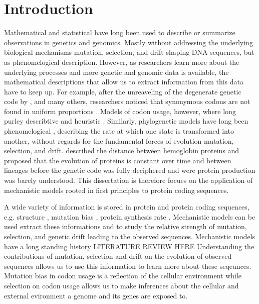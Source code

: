 \chapter{Introduction} 
\label{ch:introduction}

Mathematical and statistical have long been used to describe or summarize observations in genetics and genomics.
Mostly without addressing the underlying biological mechanisms mutation, selection, and drift shaping DNA sequences, but as phenomelogical description.
However, as researchers learn more about the underlying processes and more genetic and genomic data is available, the mathematical descriptions that allow us to extract information from this data have to keep up.
For example, after the unreaveling of the degenerate genetic code by \citet{MatthaeiAndNirenberg1961,NirenbergAndMatthaei1961,Maxwell1962,LederAndNirenberg1964}, and many others, researchers noticed that synonymous codons are not found in uniform proportions \citep{fitch1976,grantham1980,ikemura1981,grantham1981,sharp1988}.
Models of codon usage, however, where long purley describtive and heuristic \citep{ikemura1981,BennetzenAndHall1982,sharp1987,wright1990}.
Similarly, phylogenetic models have long been phenomelogical \citep{JukesAndCantor1969,Dayhoff1978,Kimura1980,felsenstein1981,Altschul1991}, describing the rate at which one state is transformed into another, without regards for the fundamental forces of evolution mutation, selection, and drift.
\citet{ZuckerkandlAndPauling1962} described the distance between hemoglobin proteins and proposed that the evolution of proteins is constant over time and between lineages before the genetic code was fully deciphered and were protein production was barely understood.
This dissertation is therefore focues on the application of mechanistic models rooted in first principles to protein coding sequences.

A wide variety of information is stored in protein and protein coding sequences, e.g. structure \citep{anfinsen1973}, mutation bias \citep{ShahAndGilchrist2011, gilchrist2015}, protein synthesis rate \citep{gilchrist2007,gilchrist2015}. 
Mechanistic models can be used extract these informations and to study the relative strength of mutation, selection, and genetic drift leading to the observed sequences.
Mechanistic models have a long standing history LITERATURE REVIEW HERE
Understanding the contributions of mutation, selection and drift on the evolution of observed sequences allows us to use this information to learn more about these seqeunces.
Mutation bias in codon usage is a reflection of the cellular environment while selection on codon usage allows us to make inferences about the cellular and external evironment a genome and its genes are exposed to.

